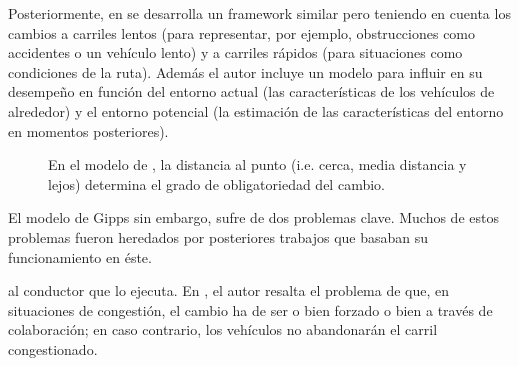 Posteriormente, en \cite{wiedemann1992microscopic} se desarrolla un framework similar pero teniendo en cuenta los cambios a carriles lentos (para representar, por ejemplo, obstrucciones como accidentes o un vehículo lento) y a carriles rápidos (para situaciones como condiciones de la ruta). Además el autor incluye un modelo para influir en su desempeño en función del entorno actual (las características de los vehículos de alrededor) y el entorno potencial (la estimación de las características del entorno en momentos posteriores).

\begin{figure}[t]
	\caption[Efecto de la distancia en el tipo de cambio de carril según el modelo de \cite{Gipps1986}]{En el modelo de \cite{Gipps1986}, la distancia al punto (i.e. cerca, media distancia y lejos) determina el grado de obligatoriedad del cambio.}
	\label{fig:lane-change-type-depending-on-the-distance}
\end{figure}


El modelo de Gipps sin embargo, sufre de dos problemas clave. Muchos de estos problemas fueron heredados por posteriores trabajos que basaban su funcionamiento en éste.

 al conductor que lo ejecuta. En \cite{Hidas2002}, el autor resalta el problema de que, en situaciones de congestión, el cambio ha de ser o bien forzado o bien a través de colaboración; en caso contrario, los vehículos no abandonarán el carril congestionado.

